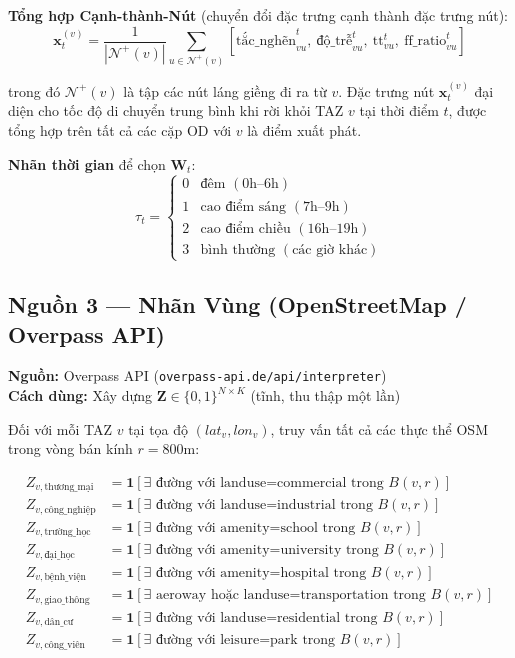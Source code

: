 \documentclass[12pt,a4paper]{article}
\begin{document}
\textbf{Tổng hợp Cạnh-thành-Nút} (chuyển đổi đặc trưng cạnh thành đặc trưng nút):
\begin{equation}
\mathbf{x}_t^{(v)} = \frac{1}{|\mathcal{N}^+(v)|}
\sum_{u \in \mathcal{N}^+(v)}
\left[\text{tắc\_nghẽn}_{vu}^t,\ \text{độ\_trễ}_{vu}^t,\ \text{tt}_{vu}^t,\ \text{ff\_ratio}_{vu}^t \right]
\end{equation}

trong đó $\mathcal{N}^+(v)$ là tập các nút láng giềng đi ra từ $v$. Đặc trưng nút $\mathbf{x}_t^{(v)}$ đại diện cho tốc độ di chuyển trung bình khi rời khỏi TAZ $v$ tại thời điểm $t$, được tổng hợp trên tất cả các cặp OD với $v$ là điểm xuất phát.

\textbf{Nhãn thời gian} để chọn $\mathbf{W}_t$:
\begin{equation}
\tau_t = \begin{cases}
0 & \text{đêm } (0\text{h}–6\text{h}) \\
1 & \text{cao điểm sáng } (7\text{h}–9\text{h}) \\
2 & \text{cao điểm chiều } (16\text{h}–19\text{h}) \\
3 & \text{bình thường } (\text{các giờ khác})
\end{cases}
\end{equation}

\subsection{Nguồn 3 — Nhãn Vùng (OpenStreetMap / Overpass API)}

\textbf{Nguồn:} Overpass API (\texttt{overpass-api.de/api/interpreter})\\
\textbf{Cách dùng:} Xây dựng $\mathbf{Z} \in \{0,1\}^{N \times K}$ (tĩnh, thu thập một lần)

Đối với mỗi TAZ $v$ tại tọa độ $(lat_v, lon_v)$, truy vấn tất cả các thực thể OSM trong vòng
bán kính $r = 800$m:

\begin{align}
Z_{v,\text{thương\_mại}} &= \mathbf{1}[\exists \text{ đường với landuse=commercial trong } B(v, r)] \\
Z_{v,\text{công\_nghiệp}} &= \mathbf{1}[\exists \text{ đường với landuse=industrial trong } B(v, r)] \\
Z_{v,\text{trường\_học}} &= \mathbf{1}[\exists \text{ đường với amenity=school trong } B(v, r)] \\
Z_{v,\text{đại\_học}} &= \mathbf{1}[\exists \text{ đường với amenity=university trong } B(v, r)] \\
Z_{v,\text{bệnh\_viện}} &= \mathbf{1}[\exists \text{ đường với amenity=hospital trong } B(v, r)] \\
Z_{v,\text{giao\_thông}} &= \mathbf{1}[\exists \text{ aeroway hoặc landuse=transportation trong } B(v, r)] \\
Z_{v,\text{dân\_cư}} &= \mathbf{1}[\exists \text{ đường với landuse=residential trong } B(v, r)] \\
Z_{v,\text{công\_viên}} &= \mathbf{1}[\exists \text{ đường với leisure=park trong } B(v, r)]
\end{align}
\end{document}
